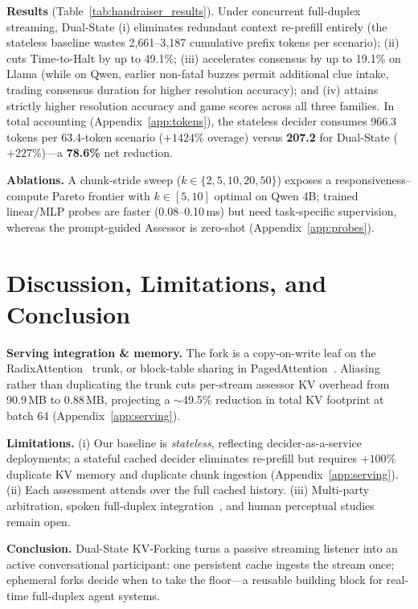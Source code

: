 \documentclass{article}
\begin{document}
\textbf{Results} (Table~\ref{tab:handraiser_results}). Under concurrent full-duplex streaming, Dual-State (i) eliminates redundant context re-prefill entirely (the stateless baseline wastes 2{,}661--3{,}187 cumulative prefix tokens per scenario); (ii) cuts Time-to-Halt by up to 49.1\%; (iii) accelerates consensus by up to 19.1\% on Llama (while on Qwen, earlier non-fatal buzzes permit additional clue intake, trading consensus duration for higher resolution accuracy); and (iv) attains strictly higher resolution accuracy and game scores across all three families. In total accounting (Appendix~\ref{app:tokens}), the stateless decider consumes 966.3 tokens per 63.4-token scenario ($+1424\%$ overage) versus \textbf{207.2} for Dual-State ($+227\%$)---a \textbf{78.6\%} net reduction.

\textbf{Ablations.} A chunk-stride sweep ($k \in \{2, 5, 10, 20, 50\}$) exposes a responsiveness--compute Pareto frontier with $k \in [5, 10]$ optimal on Qwen 4B; trained linear/MLP probes are faster (0.08--0.10\,ms) but need task-specific supervision, whereas the prompt-guided Assessor is zero-shot (Appendix~\ref{app:probes}).

\section{Discussion, Limitations, and Conclusion}
\label{sec:discussion}

\textbf{Serving integration \& memory.} The fork is a copy-on-write leaf on the RadixAttention~\citep{zheng2023sglang} trunk, or block-table sharing in PagedAttention~\citep{kwon2023vllm}. Aliasing rather than duplicating the trunk cuts per-stream assessor KV overhead from 90.9\,MB to 0.88\,MB, projecting a $\sim$49.5\% reduction in total KV footprint at batch 64 (Appendix~\ref{app:serving}).

\textbf{Limitations.} (i) Our baseline is \emph{stateless}, reflecting decider-as-a-service deployments; a stateful cached decider eliminates re-prefill but requires $+100\%$ duplicate KV memory and duplicate chunk ingestion (Appendix~\ref{app:serving}). (ii) Each assessment attends over the full cached history. (iii) Multi-party arbitration, spoken full-duplex integration~\citep{defossez2024moshi}, and human perceptual studies remain open.

\textbf{Conclusion.} Dual-State KV-Forking turns a passive streaming listener into an active conversational participant: one persistent cache ingests the stream once; ephemeral forks decide when to take the floor---a reusable building block for real-time full-duplex agent systems.
\end{document}
